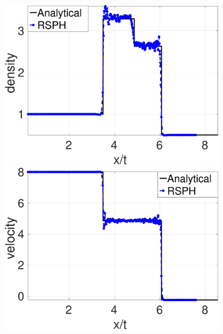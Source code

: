 \begin{figure}[H]
    \begin{minipage}{.495\textwidth}
        \centering
        \includegraphics[width=0.99 \textwidth]{Chapter-4/Figures/double_shock/Dshock-RCM-rho-Rp6}
    \end{minipage}%
    \begin{minipage}{.495 \textwidth}
        \centering
        \includegraphics[width=0.99 \textwidth]{Chapter-4/Figures/double_shock/Dshock-RCM-v-Rp6}
    \end{minipage}%
    \\
    \begin{minipage}{.495\textwidth}
        \centering

\end{minipage}
\end{figure}

